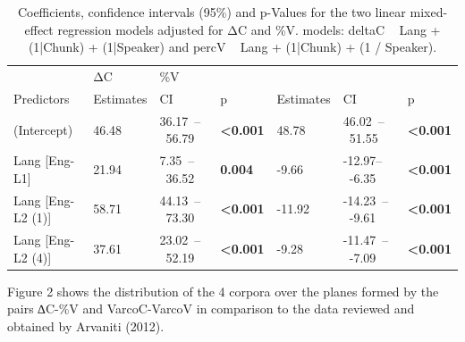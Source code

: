\begin{table}
\caption{Coefficients, confidence intervals (95\%) and p-Values for the two
linear mixed-effect regression models adjusted for ΔC and \%V. models: deltaC ~
Lang + (1|Chunk) + (1|Speaker) and percV ~ Lang + (1|Chunk) + (1 /
Speaker).}\label{leo-tab02}
\begin{tabular}{@{}lllllll@{}}
\toprule
  & ΔC & \%V & & & & \\
Predictors & Estimates & CI & p & Estimates & CI & p \\
\midrule
(Intercept) & 46.48 & 36.17~--~56.79 & \textbf{\textless0.001} & 48.78 & 46.02~--~51.55 & \textbf{\textless0.001} \\
Lang {[}Eng-L1{]} & 21.94 & 7.35~--~36.52 & \textbf{0.004} & -9.66 & -12.97--~-6.35 & \textbf{\textless0.001} \\
Lang {[}Eng-L2 (1){]} & 58.71 & 44.13~--~73.30 & \textbf{\textless0.001} & -11.92 & -14.23~--~-9.61 & \textbf{\textless0.001} \\
Lang {[}Eng-L2 (4){]} & 37.61 & 23.02~--~52.19 & \textbf{\textless0.001}& -9.28 & -11.47~--~-7.09 & \textbf{\textless0.001} \\
\bottomrule
\end{tabular}
\end{table}


Figure 2 shows the distribution of the 4 corpora over the planes formed by the
pairs ∆C-\%V and VarcoC-VarcoV in comparison to the data reviewed and obtained
by Arvaniti (2012). 

